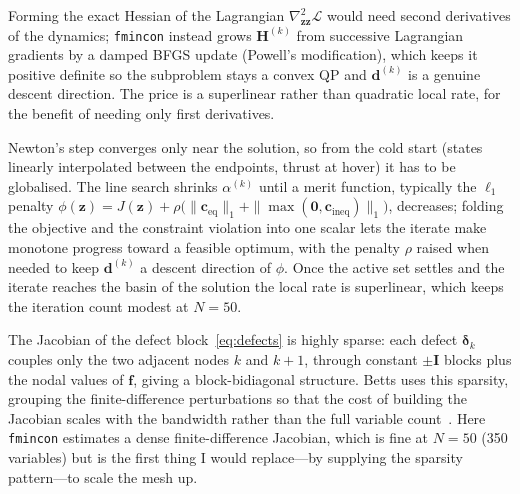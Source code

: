 \documentclass[../main.tex]{subfiles}
\begin{document}
Forming the exact Hessian of the Lagrangian $\nabla^2_{\mathbf{z}\mathbf{z}}\mathcal{L}$ would need second derivatives of the dynamics; \texttt{fmincon} instead grows $\mathbf{H}^{(k)}$ from successive Lagrangian gradients by a damped BFGS update (Powell's modification), which keeps it positive definite so the subproblem stays a convex QP and $\mathbf{d}^{(k)}$ is a genuine descent direction. The price is a superlinear rather than quadratic local rate, for the benefit of needing only first derivatives.

Newton's step converges only near the solution, so from the cold start (states linearly interpolated between the endpoints, thrust at hover) it has to be globalised. The line search shrinks $\alpha^{(k)}$ until a merit function, typically the $\ell_1$ penalty $\phi(\mathbf{z}) = J(\mathbf{z}) + \rho\bigl(\|\mathbf{c}_{\mathrm{eq}}\|_1 + \|\max(\mathbf{0},\mathbf{c}_{\mathrm{ineq}})\|_1\bigr)$, decreases; folding the objective and the constraint violation into one scalar lets the iterate make monotone progress toward a feasible optimum, with the penalty $\rho$ raised when needed to keep $\mathbf{d}^{(k)}$ a descent direction of $\phi$. Once the active set settles and the iterate reaches the basin of the solution the local rate is superlinear, which keeps the iteration count modest at $N = 50$.

The Jacobian of the defect block~\eqref{eq:defects} is highly sparse: each defect $\boldsymbol{\delta}_k$ couples only the two adjacent nodes $k$ and $k+1$, through constant $\pm\mathbf{I}$ blocks plus the nodal values of $\mathbf{f}$, giving a block-bidiagonal structure. Betts uses this sparsity, grouping the finite-difference perturbations so that the cost of building the Jacobian scales with the bandwidth rather than the full variable count~\cite[Sec.~4.6]{betts2010}. Here \texttt{fmincon} estimates a dense finite-difference Jacobian, which is fine at $N = 50$ (350 variables) but is the first thing I would replace---by supplying the sparsity pattern---to scale the mesh up.
\end{document}
